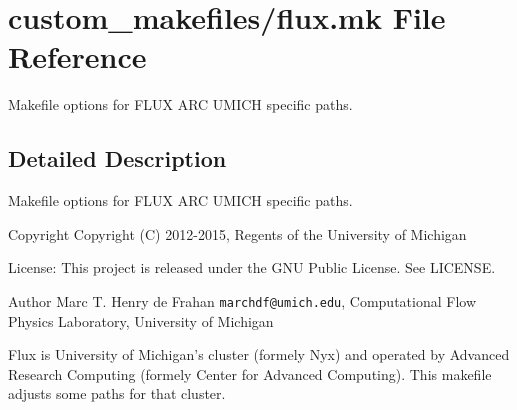 \section{custom\-\_\-makefiles/flux.mk File Reference}
\label{flux_8mk}


Makefile options for F\-L\-U\-X A\-R\-C U\-M\-I\-C\-H specific paths.  




\subsection{Detailed Description}
Makefile options for F\-L\-U\-X A\-R\-C U\-M\-I\-C\-H specific paths. \begin{DoxyCopyright}{Copyright}
Copyright (C) 2012-\/2015, Regents of the University of Michigan 
\end{DoxyCopyright}
\begin{DoxyParagraph}{License\-:}
This project is released under the G\-N\-U Public License. See L\-I\-C\-E\-N\-S\-E. 
\end{DoxyParagraph}
\begin{DoxyAuthor}{Author}
Marc T. Henry de Frahan {\tt marchdf@umich.\-edu}, Computational Flow Physics Laboratory, University of Michigan
\end{DoxyAuthor}
Flux is University of Michigan's cluster (formely Nyx) and operated by Advanced Research Computing (formely Center for Advanced Computing). This makefile adjusts some paths for that cluster. 
